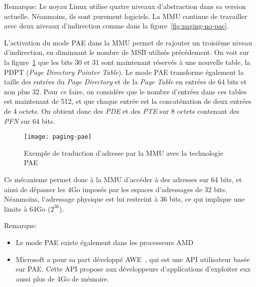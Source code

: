       \begin{paragraph}{Remarque:}
        Le noyau Linux utilise quatre niveaux d'abstraction dans sa version
        actuelle. Néanmoins, ils sont purement logiciels. La MMU continue de
        travailler avec deux niveaux d'indirection comme dans la
        figure~\ref{fig:paging-no-pae}.\\
      \end{paragraph}
      
      L'activation du mode PAE dans la MMU permet de rajouter un troisième
      niveau d'indirection, en diminuant le nombre de MSB utilisés
      précédement. On voit sur la figure~\ref{fig:paging-pae} que les bits 30 et
      31 sont maintenant réservés à une nouvelle table, la PDPT (\textit{Page
        Directory Pointer Table}). Le mode PAE transforme également la taille
      des entrées du \textit{Page Directory} et de la \textit{Page Table} en
      entrées de 64 bits et non plus 32. Pour ce faire, on considére que le
      nombre d'entrées dans ces tables est maintenant de 512, et que chaque
      entrée est la concaténation de deux entrées de 4 octets. On obtient donc
      des \textit{PDE} et des \textit{PTE} sur 8 octets contenant des
      \textit{PFN} sur 64 bits.

      \begin{figure}[ht]
        \centering \texttt{[image: paging-pae]}
        \caption{Exemple de traduction d'adresse par la MMU avec la technologie
          PAE}
        \label{fig:paging-pae}
      \end{figure}
      
      Ce mécanisme permet donc à la MMU d'accéder à des adresses sur 64 bits, et
      ainsi de dépasser les 4Go imposés par les espaces d'adressages de 32
      bits. Néanmoins, l'adressage physique est lui restreint à 36 bits, ce qui
      implique une limite à 64Go ($2^{36}$).

      \begin{paragraph}{Remarque:}
        \begin{itemize}
          \item Le mode PAE existe également dans les processeurs
            AMD~\citep{amd2000system}
          \item Microsoft a pour sa part développé
            AWE~\citep{russinovich2012windows}, qui est une API utilisateur
            basée sur PAE. Cette API propose aux développeurs d'applications
            d'exploiter eux aussi plus de 4Go de mémoire.
        \end{itemize}
      \end{paragraph}


